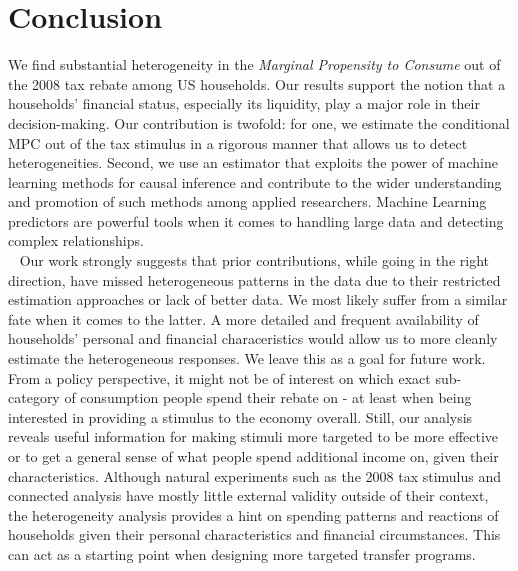 \section{Conclusion} \label{sec:conc}
We find substantial heterogeneity in the \textit{Marginal Propensity to Consume} out of the 2008 tax rebate among US households. Our results support the notion that a households' financial status, especially its liquidity, play a major role in their decision-making. Our contribution is twofold: for one, we estimate the conditional MPC out of the tax stimulus in a rigorous manner that allows us to detect heterogeneities. Second, we use an estimator that exploits the power of machine learning methods for causal inference and contribute to the wider understanding and promotion of such methods among applied researchers. Machine Learning predictors are powerful tools when it comes to handling large data and detecting complex relationships. \\ 
Our work strongly suggests that prior contributions, while going in the right direction, have missed heterogeneous patterns in the data due to their restricted estimation approaches or lack of better data. We most likely suffer from a similar fate when it comes to the latter. A more detailed and frequent availability of households' personal and financial characeristics would allow us to more cleanly estimate the heterogeneous responses. We leave this as a goal for future work. \\
From a policy perspective, it might not be of interest on which exact sub-category of consumption people spend their rebate on - at least when being interested in providing a stimulus to the economy overall. Still, our analysis reveals useful information for making stimuli more targeted to be more effective or to get a general sense of what people spend additional income on, given their characteristics. Although natural experiments such as the 2008 tax stimulus and connected analysis have mostly little external validity outside of their context, the heterogeneity analysis provides a hint on spending patterns and reactions of households given their personal characteristics and financial circumstances. This can act as a starting point when designing more targeted transfer programs. 